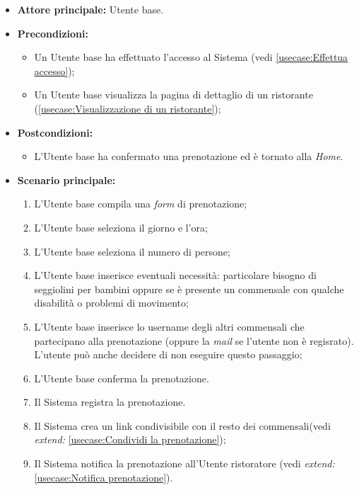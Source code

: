 \label{usecase:Prenotazione di un tavolo}
\begin{itemize}
	\item \textbf{Attore principale:} Utente base.
	\item \textbf{Precondizioni:}
		\begin{itemize}
			\item Un Utente base ha effettuato l'accesso al Sistema (vedi \autoref{usecase:Effettua accesso});
			\item Un Utente base visualizza la pagina di dettaglio di un ristorante (\autoref{usecase:Visualizzazione di un ristorante});
		\end{itemize}
	\item \textbf{Postcondizioni:}
		\begin{itemize}
			\item L'Utente base ha confermato una prenotazione ed è tornato alla \textit{Home}.
		\end{itemize} 
	      
	\item \textbf{Scenario principale:}
	      \begin{enumerate}
		      \item L'Utente base compila una \textit{form} di prenotazione;
		      \item L'Utente base seleziona il giorno e l'ora;
		      \item L'Utente base seleziona il numero di persone;
		      \item L'Utente base inserisce eventuali necessità: particolare bisogno di seggiolini per bambini oppure se è presente un commensale con qualche disabilità o problemi di movimento;
		      \item L'Utente base inserisce lo username degli altri commensali che partecipano alla prenotazione (oppure la \textit{mail} se l'utente non è regisrato).
			  L'utente può anche decidere di non eseguire questo passaggio;
		      \item L'Utente base conferma la prenotazione.
		      \item Il Sistema registra la prenotazione.
		      \item Il Sistema crea un link condivisibile con il resto dei commensali(vedi \textit{extend:} \autoref{usecase:Condividi la prenotazione});
		      \item Il Sistema notifica la prenotazione all'Utente ristoratore (vedi \textit{extend:} \autoref{usecase:Notifica prenotazione}).
	      \end{enumerate}


\end{itemize}
